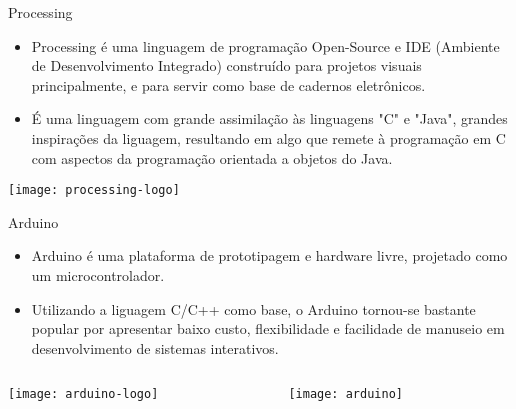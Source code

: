 \begin{frame}[c]{Processing}
 
    \begin{itemize}
        \item Processing é uma linguagem de programação Open-Source e IDE (Ambiente de Desenvolvimento Integrado) construído para projetos visuais principalmente, e para servir como base de cadernos eletrônicos.
        \item É uma linguagem com grande assimilação às linguagens "C" e "Java", grandes inspirações da liguagem, resultando em algo que remete à programação em C com aspectos da programação orientada a objetos do Java.
    \end{itemize}
	\vspace{0.4cm}
	\centering
	\texttt{[image: processing-logo]}   

\end{frame}
\begin{frame}[t]{Arduino}
      \begin{itemize}
        \item Arduino é uma plataforma de prototipagem e hardware livre, projetado como um microcontrolador.
        \item Utilizando a liguagem C/C++ como base, o Arduino tornou-se bastante popular por apresentar baixo custo, flexibilidade e facilidade de manuseio em desenvolvimento de sistemas interativos.
    \end{itemize}
\vspace{0.3cm}
\begin{columns}
	\begin{column}{0.4\textwidth}
        	\centering
		\texttt{[image: arduino-logo]} 
	\end{column}
		\begin{column}{0.4\textwidth}
		\centering
       	\texttt{[image: arduino]} 
	\end{column}
\end{columns}


\end{frame}

